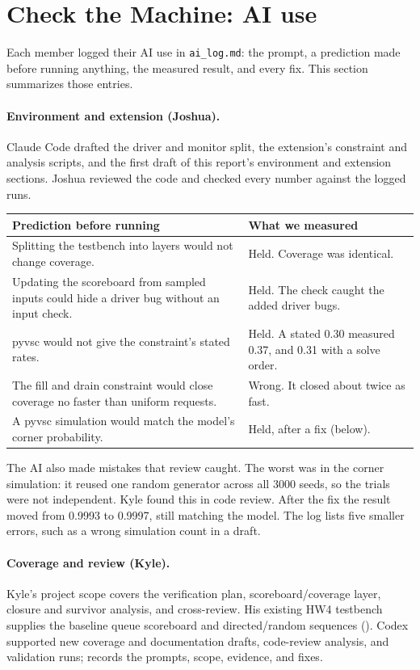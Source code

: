 \section{Check the Machine: AI use}
\label{sec:ai}

Each member logged their AI use in \texttt{ai\_log.md}: the prompt, a
prediction made before running anything, the measured result, and every fix.
This section summarizes those entries.

\paragraph{Environment and extension (Joshua).} Claude Code drafted the
driver and monitor split, the extension's constraint and analysis scripts, and
the first draft of this report's environment and extension sections. Joshua
reviewed the code and checked every number against the logged runs.
\begin{center}
\begin{tabular}{@{}>{\raggedright\arraybackslash}p{}>{\raggedright\arraybackslash}p{}@{}}
\toprule
\textbf{Prediction before running} & \textbf{What we measured} \\
\midrule
Splitting the testbench into layers would not change coverage. & Held. Coverage was identical. \\
Updating the scoreboard from sampled inputs could hide a driver bug without an input check. & Held. The check caught the added driver bugs. \\
pyvsc would not give the constraint's stated rates. & Held. A stated 0.30 measured 0.37, and 0.31 with a solve order. \\
The fill and drain constraint would close coverage no faster than uniform requests. & Wrong. It closed about twice as fast. \\
A pyvsc simulation would match the model's corner probability. & Held, after a fix (below). \\
\bottomrule
\end{tabular}
\end{center}
\noindent
The AI also made mistakes that review caught. The worst was in the corner
simulation: it reused one random generator across all 3000 seeds, so the
trials were not independent. Kyle found this in code review. After the fix the
result moved from 0.9993 to 0.9997, still matching the model. The log lists
five smaller errors, such as a wrong simulation count in a draft.

\paragraph{Coverage and review (Kyle).} Kyle's project scope covers the
verification plan, scoreboard/coverage layer, closure and survivor analysis,
and cross-review. His existing HW4 testbench supplies the baseline queue
scoreboard and directed/random sequences (). Codex supported
new coverage and documentation drafts, code-review analysis, and validation
runs;  records the prompts, scope, evidence, and fixes.

